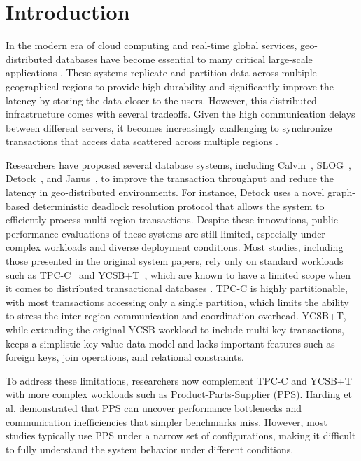 \section{Introduction}
\label{sec: introduction}

In the modern era of cloud computing and real-time global services, geo-distributed databases have become essential to many critical large-scale applications \cite{corbett2013spanner, bronson2013tao}. These systems replicate and partition data across multiple geographical regions to provide high durability and significantly improve the latency by storing the data closer to the users. However, this distributed infrastructure comes with several tradeoffs. Given the high communication delays between different servers, it becomes increasingly challenging to synchronize transactions that access data scattered across multiple regions \cite{bailis2013highly}.

Researchers have proposed several database systems, including Calvin~\cite{thomson2012calvin}, SLOG~\cite{ren2019slog}, Detock~\cite{nguyen2023detock}, and Janus~\cite {mu2016consolidating}, to improve the transaction throughput and reduce the latency in geo-distributed environments. For instance, Detock uses a novel graph-based deterministic deadlock resolution protocol that allows the system to efficiently process multi-region transactions. Despite these innovations, public performance evaluations of these systems are still limited, especially under complex workloads and diverse deployment conditions. Most studies, including those presented in the original system papers, rely only on standard workloads such as TPC-C~\cite{leutenegger1993modeling} and YCSB+T~\cite{dey2014ycsb+}, which are known to have a limited scope when it comes to distributed transactional databases \cite{qu2022current}. TPC-C is highly partitionable, with most transactions accessing only a single partition, which limits the ability to stress the inter-region communication and coordination overhead. YCSB+T, while extending the original YCSB workload to include multi-key transactions, keeps a simplistic key-value data model and lacks important features such as foreign keys, join operations, and relational constraints.

To address these limitations, researchers now complement TPC-C and YCSB+T with more complex workloads such as Product-Parts-Supplier (PPS). Harding et al.\cite{harding2017evaluation} demonstrated that PPS can uncover performance bottlenecks and communication inefficiencies that simpler benchmarks miss. However, most studies typically use PPS under a narrow set of configurations, making it difficult to fully understand the system behavior under different conditions.

